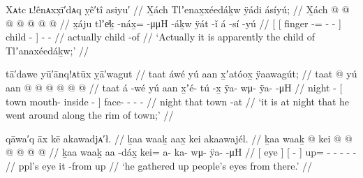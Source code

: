 \ex\label{ex:94-8-actually-wealth-woman}%
%
\begingl
	\glpreamble	Xᴀtc ʟ!ênᴀxx̣ī′dᴀq ỵê′tî asiyu′ //
	\glpreamble	X̱ách Tlʼenax̱xéedáḵw ÿádi ásíyú; //
	\gla	X̱ách
		{} {}  @ {} @ {} @ {} @ {} {}  @ {} {}
		 @ {} @ {} //
	\glb	x̱áju
		{} {} tlʼeͥḵ -náx̱=  -μμH -áḵw {} ÿát -ǐ {} 
		á -sí -yú //
	\glc	{}
		{}[\pr{NP} {}[ finger -=  - - {}] child - {}]
		 - - //
	\gld	actually {} {}  {} {} {} {} {} child -of {}
		 {} {} //
	\glft	‘Actually it is apparently the child of Tlʼanaxéedáḵw;’
		//
\endgl
\xe




\ex\label{ex:94-9-night-went-town-rim}%
%
\begingl
	\glpreamble	tā′dawe yū′ānq!ᴀtūx ỵā′wagut //
	\glpreamble	taat áwé yú aan x̱ʼatóox̱ ÿaawagút; //
	\gla	taat  @ {} {} yú aan  @ {} @ {} {}
		 @ {} @ {} @ {} @ {} //
	\glb	taat á -wé {} yú aan x̱ʼé- tú -x̱ {}
		ÿa- wμ- ÿa-  -μH //
	\glc	night  - {}[  town mouth- inside - {}]
		face- - -  - //
	\gld	night  {} {} that town  {} -at {}
		 {} {} {} {} //
	\glft	‘it is at night that he went around along the rim of town;’
		//
\endgl
\xe



\ex\label{ex:94-10-took-peoples-eyes}%
%
\begingl
	\glpreamble	qāwa′q āx kē akawadjᴀ′ł. //
	\glpreamble	ḵaa waaḵ aax̱ kei akaawajél. //
	\gla	{} ḵaa waaḵ {} {}  @ {} {}
		kei @  @ {} @ {} @ {} @ {} @ {} //
	\glb	{} ḵaa waaḵ {} {} aa -dáx̱ {}
		kei= a- ka- wμ- ÿa-  -μH //
	\glc	{}[  eye {}] {}[  - {}]
		up= - - - -  - //
	\gld	{} ppl’s eye {} {} it -from {}
		up\•  {} {} {} {} {} //
	\glft	‘he gathered up people’s eyes from there.’
		//
\endgl
\xe

